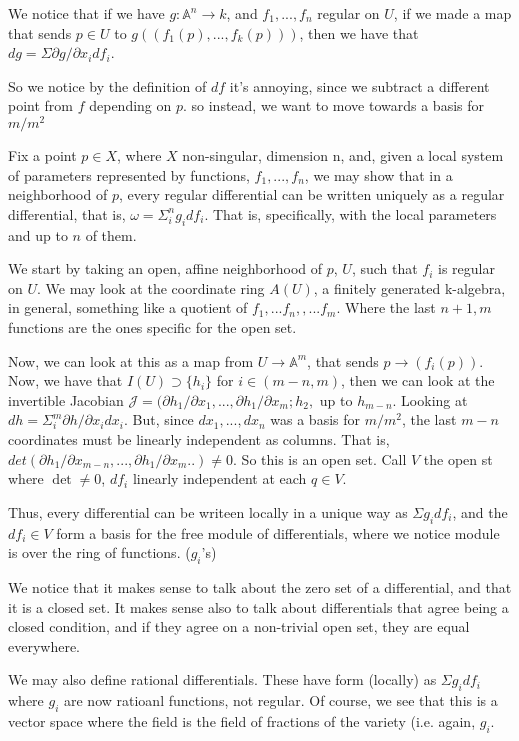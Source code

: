 \documentclass[10pt]{article}
\begin{document}
We notice that if we have $g: \mathbb{A}^n \to k$, and $f_1,...,f_n$ regular on $U$, if we made a map that sends $p \in U$ to $g((f_1(p),...,f_k(p)))$, then we have that  $dg = \Sigma \partial g/\partial x_i df_i$.

So we notice by the definition of $df$ it’s annoying, since we subtract a different point from $f$ depending on $p$. so instead, we want to move towards a basis for $m/m^2$

Fix a point $p \in X$, where $X$ non-singular, dimension n, and, given a local system of parameters represented by functions, $f_1,...,f_n$, we may show that in a neighborhood of $p$, every regular differential can be written uniquely as a regular differential, that is, $\omega = \Sigma_i^n g_i df_i$. That is, specifically, with the local parameters and up to $n$ of them.

We start by taking an open, affine neighborhood of $p$, $U$, such that $f_i$ is regular on $U$. We may look at the coordinate ring $A(U)$, a finitely generated k-algebra, in general, something like a quotient of $f_1,...f_n,,...f_m$. Where the last $n+1,m$ functions are the ones specific for the open set.

Now, we can look at this as a map from $U \to \mathbb{A}^m$, that sends $p \to (f_i(p))$. Now, we have that $I(U) \supset \{ h_i \}$ for $i \in (m-n, m)$, then we can look at the invertible Jacobian $\mathcal{J}  = (\partial h_1/\partial x_1, ..., \partial h_1/\partial x_m; h_2, $ up to $h_{m-n}$. Looking at $dh = \Sigma_i^m \partial h/\partial x_i dx_i$. But, since $dx_1,...,dx_n$ was a basis for $m/m^2$, the last $m-n$ coordinates must be linearly independent as columns. That is, $ det(\partial h_1/\partial x_{m-n},...,\partial h_1/\partial x_m .. ) \not = 0$. So this is an open set. Call $V$ the open st where $\det \not = 0$, $df_i$ linearly independent at each $q \in V$.

Thus, every differential can be writeen locally in a unique way as $\Sigma g_i df_i$, and the $df_i \in V$ form a basis for the free module of differentials, where we notice module is over the ring of functions. ($g_i$’s)

We notice that it makes sense to talk about the zero set of a differential, and that it is a closed set. It makes sense also to talk about differentials that agree being a closed condition, and if they agree on a non-trivial open set, they are equal everywhere.

We may also define rational differentials. These have form (locally) as $\Sigma g_i df_i$ where $g_i$ are now ratioanl functions, not regular. Of course, we see that this is a vector space where the field is the field of fractions of the variety (i.e. again, $g_i$. 
\end{document}
